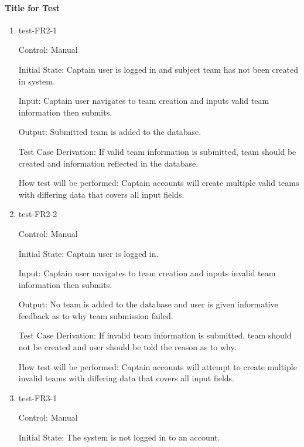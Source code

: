\documentclass[12pt, titlepage]{article}
\begin{document}
\paragraph{Title for Test}

\begin{enumerate}

  \item{test-FR2-1\\}

  Control: Manual
            
  Initial State: Captain user is logged in and subject team has not been 
  created in system.
            
  Input: Captain user navigates to team creation and inputs valid team 
  information then submits. 
            
  Output: Submitted team is added to the database.
  
  Test Case Derivation: If valid team information is submitted, team
  should be created and information reflected in the database.
  
  How test will be performed: Captain accounts will create multiple
  valid teams with differing data that covers all input fields.

  \item{test-FR2-2\\}

  Control: Manual
            
  Initial State: Captain user is logged in.
            
  Input: Captain user navigates to team creation and inputs invalid team 
  information then submits. 
            
  Output: No team is added to the database and user is given informative 
  feedback as to why team submission failed.
  
  Test Case Derivation: If invalid team information is submitted, team
  should not be created and user should be told the reason as to why.
  
  How test will be performed: Captain accounts will attempt to create 
  multiple invalid teams with differing data that covers all input fields. 

  \item{test-FR3-1\\}

  Control: Manual
            
  Initial State: The system is not logged in to an account.
            

\end{enumerate}
\end{document}
